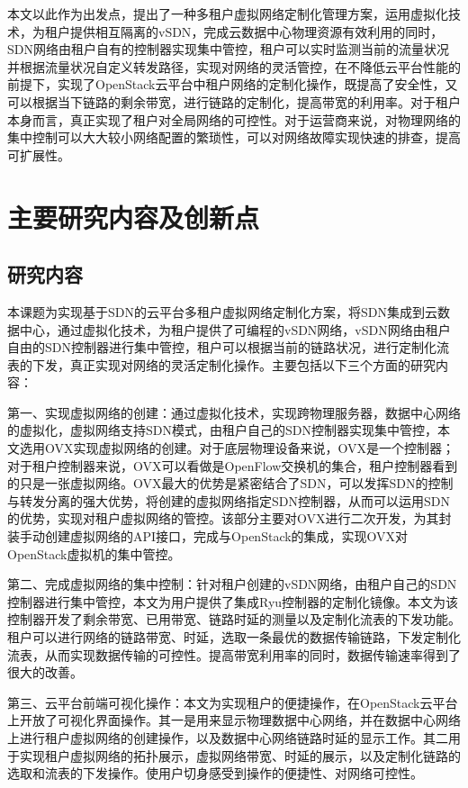 本文以此作为出发点，提出了一种多租户虚拟网络定制化管理方案，运用虚拟化技术，为租户提供相互隔离的\gls*{vSDN}，完成云数据中心物理资源有效利用的同时，SDN网络由租户自有的控制器实现集中管控，租户可以实时监测当前的流量状况并根据流量状况自定义转发路径，实现对网络的灵活管控，在不降低云平台性能的前提下，实现了OpenStack云平台中租户网络的定制化操作，既提高了安全性，又可以根据当下链路的剩余带宽，进行链路的定制化，提高带宽的利用率。对于租户本身而言，真正实现了租户对全局网络的可控性。对于运营商来说，对物理网络的集中控制可以大大较小网络配置的繁琐性，可以对网络故障实现快速的排查，提高可扩展性。

\section{主要研究内容及创新点}
\subsection{研究内容}
本课题为实现基于SDN的云平台多租户虚拟网络定制化方案，将SDN集成到云数据中心，通过虚拟化技术，为租户提供了可编程的vSDN网络，vSDN网络由租户自由的SDN控制器进行集中管控，租户可以根据当前的链路状况，进行定制化流表的下发，真正实现对网络的灵活定制化操作。主要包括以下三个方面的研究内容：

第一、实现虚拟网络的创建：通过虚拟化技术，实现跨物理服务器，数据中心网络的虚拟化，虚拟网络支持SDN模式，由租户自己的SDN控制器实现集中管控，本文选用\gls*{OVX}\cite{OVX-1}实现虚拟网络的创建。对于底层物理设备来说，OVX是一个控制器；对于租户控制器来说，OVX可以看做是OpenFlow交换机的集合，租户控制器看到的只是一张虚拟网络。OVX最大的优势是紧密结合了SDN，可以发挥SDN的控制与转发分离的强大优势，将创建的虚拟网络指定SDN控制器，从而可以运用SDN的优势，实现对租户虚拟网络的管控。该部分主要对OVX进行二次开发，为其封装手动创建虚拟网络的API接口，完成与OpenStack的集成，实现OVX对OpenStack虚拟机的集中管控。

第二、完成虚拟网络的集中控制：针对租户创建的vSDN网络，由租户自己的SDN控制器进行集中管控，本文为用户提供了集成Ryu控\cite{Ryu-1}制器的定制化镜像。本文为该控制器开发了剩余带宽、已用带宽、链路时延的测量以及定制化流表的下发功能。租户可以进行网络的链路带宽、时延，选取一条最优的数据传输链路，下发定制化流表，从而实现数据传输的可控性。提高带宽利用率的同时，数据传输速率得到了很大的改善。

第三、云平台前端可视化操作：本文为实现租户的便捷操作，在OpenStack云平台上开放了可视化界面操作。其一是用来显示物理数据中心网络，并在数据中心网络上进行租户虚拟网络的创建操作，以及数据中心网络链路时延的显示工作。其二用于实现租户虚拟网络的拓扑展示，虚拟网络带宽、时延的展示，以及定制化链路的选取和流表的下发操作。使用户切身感受到操作的便捷性、对网络可控性。

